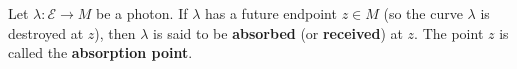Let $\lambda: \mathcal{E} \rightarrow M$ be a photon. If $\lambda$ has a future endpoint $z \in M$ (so the curve $\lambda$ is destroyed at $z$), then $\lambda$ is said to be \textbf{absorbed} (or \textbf{received}) at $z$. The point $z$ is called the \textbf{absorption point}.

